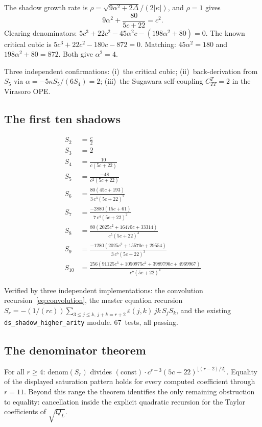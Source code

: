 \documentclass[11pt]{article}
\begin{document}
The shadow growth rate is
$\rho = \sqrt{9\alpha^2 + 2\Delta}/(2|\kappa|)$, and
$\rho = 1$ gives
\[
9\alpha^2 + \frac{80}{5c+22} = c^2.
\]
Clearing denominators:
$5c^3 + 22c^2 - 45\alpha^2 c - (198\alpha^2 + 80) = 0$.
The known critical cubic is
$5c^3 + 22c^2 - 180c - 872 = 0$.  Matching:
$45\alpha^2 = 180$ and $198\alpha^2 + 80 = 872$.  Both give
$\alpha^2 = 4$.

Three independent confirmations: (i)~the critical cubic;
(ii)~back-derivation from $S_5$ via
$\alpha = -5\kappa S_5/(6S_4) = 2$; (iii)~the Sugawara
self-coupling $C_{TT}^T = 2$ in the Virasoro OPE.

\subsection*{The first ten shadows}

\begin{align*}
S_2 &= \frac{c}{2} \\
S_3 &= 2 \\
S_4 &= \frac{10}{c(5c+22)} \\
S_5 &= \frac{-48}{c^2(5c+22)} \\
S_6 &= \frac{80(45c+193)}{3\,c^3(5c+22)^2} \\
S_7 &= \frac{-2880(15c+61)}{7\,c^4(5c+22)^2} \\
S_8 &= \frac{80(2025c^2 + 16470c + 33314)}{c^5(5c+22)^3} \\
S_9 &= \frac{-1280(2025c^2 + 15570c + 29554)}{3\,c^6(5c+22)^3} \\
S_{10} &= \frac{256(91125c^3 + 1050975c^2 + 3989790c + 4969967)}{c^7(5c+22)^4}
\end{align*}

Verified by three independent implementations: the convolution
recursion~\eqref{eq:convolution}, the master equation recursion
$S_r = -(1/(rc))\sum_{3 \leq j \leq k,\, j+k=r+2}
\varepsilon(j,k)\,jk\,S_j S_k$, and the existing
\texttt{ds\_shadow\_higher\_arity} module.  $67$~tests, all passing.

\subsection*{The denominator theorem}

\begin{theorem}\label{thm:denom-pattern}
For all $r \geq 4$:
$\mathrm{denom}(S_r)$ divides
$(\mathrm{const}) \cdot c^{r-3}(5c+22)^{\lfloor(r-2)/2\rfloor}$.
Equality of the displayed saturation pattern holds for every
computed coefficient through $r=11$.  Beyond this range the theorem
identifies the only remaining obstruction to equality: cancellation
inside the explicit quadratic recursion for the Taylor coefficients
of $\sqrt{Q_L}$.
\end{theorem}
\end{document}
